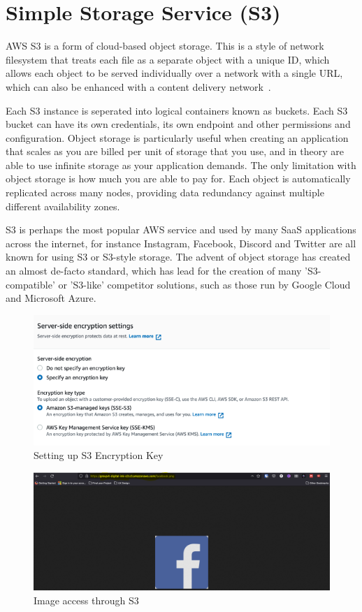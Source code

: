 \chapter{Simple Storage Service (S3)}\label{ch:simple-storage-service}

AWS S3 is a form of cloud-based object storage.
This is a style of network filesystem that treats each file as a separate object with a unique ID, which allows each
object to be served individually over a network with a single URL, which can also be enhanced with a content delivery
network~\parencite{amazon2022cloud}.

Each S3 instance is seperated into logical containers known as buckets.
Each S3 bucket can have its own credentials, its own endpoint and other permissions and configuration.
Object storage is particularly useful when creating an application that scales as you are billed per unit of storage
that you use, and in theory are able to use infinite storage as your application demands.
The only limitation with object storage is how much you are able to pay for.
Each object is automatically replicated across many nodes, providing data redundancy against multiple different
availability zones.

S3 is perhaps the most popular AWS service and used by many SaaS applications across the internet, for instance
Instagram, Facebook, Discord and Twitter are all known for using S3 or S3-style storage.
The advent of object storage has created an almost de-facto standard, which has lead for the creation of many
'S3-compatible' or 'S3-like' competitor solutions, such as those run by Google Cloud and Microsoft Azure.


\begin{figure}
    \centering
    \includegraphics[width=\textwidth]{resources/s3/s3_encryption.PNG}
    \caption{Setting up S3 Encryption Key}
    \label{fig:s3-image-2}
\end{figure}

\begin{figure}
    \centering
    \includegraphics[width=\textwidth]{resources/s3/s3-image-displayed}
    \caption{Image access through S3}
    \label{fig:s3-image}
\end{figure}
